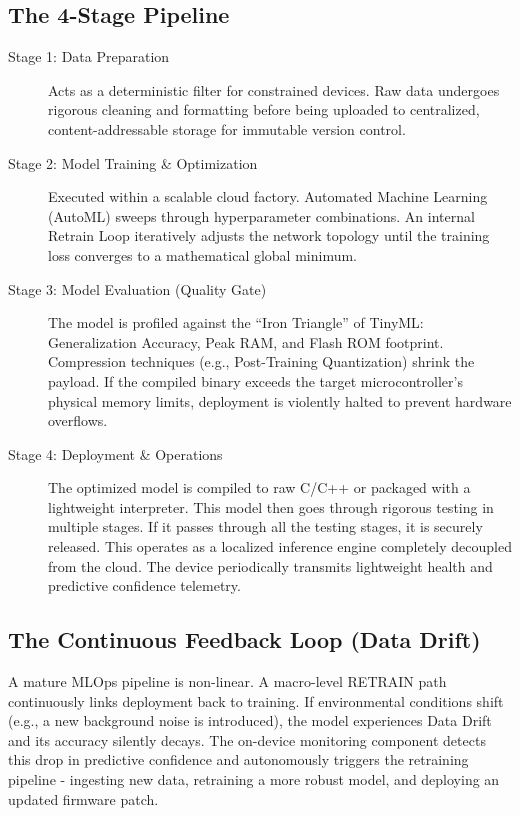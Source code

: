 \documentclass[11pt,a4paper,openany]{book}
\begin{document}
\subsection{The 4-Stage Pipeline}
\begin{description}
    \item[Stage 1: Data Preparation] Acts as a deterministic filter for constrained devices. Raw data undergoes rigorous cleaning and formatting before being uploaded to centralized, content-addressable storage for immutable version control.
    \item[Stage 2: Model Training \& Optimization] Executed within a scalable cloud factory. Automated Machine Learning (AutoML) sweeps through hyperparameter combinations. An internal Retrain Loop iteratively adjusts the network topology until the training loss converges to a mathematical global minimum.
    \item[Stage 3: Model Evaluation (Quality Gate)] The model is profiled against the ``Iron Triangle'' of TinyML: Generalization Accuracy, Peak RAM, and Flash ROM footprint. Compression techniques (e.g., Post-Training Quantization) shrink the payload. If the compiled binary exceeds the target microcontroller's physical memory limits, deployment is violently halted to prevent hardware overflows.
    \item[Stage 4: Deployment \& Operations] The optimized model is compiled to raw C/C++ or packaged with a lightweight interpreter. This model then goes through rigorous testing in multiple stages. If it passes through all the testing stages, it is securely released. This operates as a localized inference engine completely decoupled from the cloud. The device periodically transmits lightweight health and predictive confidence telemetry.
\end{description}

\subsection{The Continuous Feedback Loop (Data Drift)}
A mature MLOps pipeline is non-linear. A macro-level RETRAIN path continuously links deployment back to training. If environmental conditions shift (e.g., a new background noise is introduced), the model experiences Data Drift and its accuracy silently decays. The on-device monitoring component detects this drop in predictive confidence and autonomously triggers the retraining pipeline - ingesting new data, retraining a more robust model, and deploying an updated firmware patch.
\end{document}
